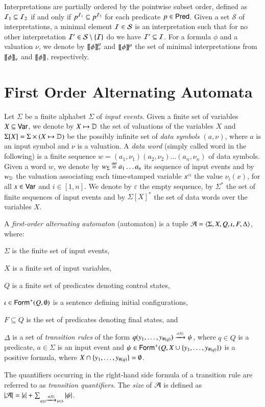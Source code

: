 \documentclass{llncs}
\begin{document}
Interpretations are partially ordered by the pointwise subset order,
defined as $\mathcal{I}_1 \subseteq \mathcal{I}_2$ if and only if $p^{\mathcal{I}_1} \subseteq
p^{\mathcal{I}_2}$ for each predicate $p \in \mathsf{Pred}$. Given a set $\mathcal{S}$
of interpretations, a minimal element $\mathcal{I} \in \mathcal{S}$ is an
interpretation such that for no other interpretation $\mathcal{I}' \in
\mathcal{S} \setminus \{ \mathcal{I} \}$ do we have $\mathcal{I}' \subseteq \mathcal{I}$. For a
formula $\phi$ and a valuation $\nu$, we denote by ${\bf [\![} \phi {\bf ]\!]}^\mu_\nu$
and ${\bf [\![} \phi {\bf ]\!]}^\mu$ the set of minimal interpretations from
${\bf [\![} \phi {\bf ]\!]}_\nu$ and ${\bf [\![} \phi {\bf ]\!]}$, respectively.

\section{First Order Alternating Automata}

Let $\Sigma$ be a finite alphabet $\Sigma$ of \emph{input
  events}. Given a finite set of variables $X \subseteq \mathsf{Var}$, we denote by $X
\mapsto \mathbb{D}$ the set of valuations of the variables $X$ and
$\Sigma[X] = \Sigma \times (X \mapsto \mathbb{D})$ be the possibly infinite
set of \emph{data symbols} $(a,\nu)$, where $a$ is an input symbol and
$\nu$ is a valuation. A \emph{data word} (simply called word in the
following) is a finite sequence $w=(a_1,\nu_1)(a_2,\nu_2) \ldots
(a_n,\nu_n)$ of data symbols. Given a word $w$, we denote by
${w}_\Sigma \stackrel{\scriptscriptstyle{\mathsf{def}}}{=} a_1\ldots a_n$ its sequence of input events and by
${w}_{\mathbb{D}}$ the valuation associating each time-stamped variable
${x}^{\scriptscriptstyle{({i})}}$ the value $\nu_i(x)$, for all $x \in \mathsf{Var}$ and
$i\in[1,n]$. We denote by $\varepsilon$ the empty sequence, by
$\Sigma^*$ the set of finite sequences of input events and by
$\Sigma[X]^*$ the set of data words over the variables $X$.

A \emph{first-order alternating automaton} (automaton) is a tuple $\mathcal{A}
= \langle \Sigma,X,Q,\iota,F,\Delta \rangle$, where: \begin{compactitem}
\item $\Sigma$ is the finite set of input events, 
\item $X$ is a finite set of input variables, 
\item $Q$ is a finite set of predicates denoting control states, 
\item $\iota \in \mathsf{Form}^+(Q,\emptyset)$ is a sentence defining initial configurations,
\item $F \subseteq Q$ is the set of predicates denoting final states, and 
\item $\Delta$ is a set of \emph{transition rules} of the form
  \(q(y_1,\ldots,y_{\#(q)}) \xrightarrow{{\scriptscriptstyle a(X)}}_{{\scriptstyle }} \psi\), where $q \in Q$ is
  a predicate, $a \in \Sigma$ is an input event and $\psi \in
  \mathsf{Form}^+(Q,X \cup \{ y_1,\ldots,y_{\#(q)} \})$ is a positive
  formula, where $X \cap \{ y_1,\ldots,y_{\#(q)} \} = \emptyset$.
\end{compactitem}
The quantifiers occurring in the right-hand side formula of a
transition rule are referred to as \emph{transition quantifiers}. The
\emph{size} of $\mathcal{A}$ is defined as ${|{\mathcal{A}}|} = {|{\iota}|} +
\sum_{\scriptscriptstyle{q(\mathbf y) \xrightarrow{{\scriptscriptstyle a(X)}}_{{\scriptstyle }} \psi \in \Delta}}
{|{\psi}|}$.
\end{document}
